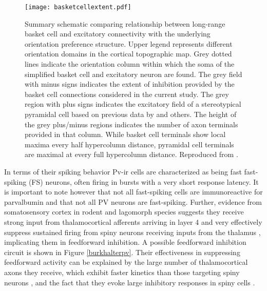 \begin{figure}
	\centering
        \texttt{[image: basketcellextent.pdf]}
	\caption[Schematic representing the proposed spatial distribution
      of pyramidal and basket cell extents and their relationship to
      the orientation map in V1. Reproduced from
      \cite{Buzas2001}.]{Summary schematic comparing relationship
      between long-range basket cell and excitatory connectivity with
      the underlying orientation preference structure. Upper legend
      represents different orientation domains in the cortical
      topographic map. Grey dotted lines indicate the orientation
      column within which the soma of the simplified basket cell and
      excitatory neuron are found. The grey field with minus signs
      indicates the extent of inhibition provided by the basket cell
      connections considered in the current study. The grey region
      with plus signs indicates the excitatory field of a
      stereotypical pyramidal cell based on previous data by
      \cite{Bosking1997,Kisvarday1997a} and others. The height of the
      grey plus/minus regions indicates the number of axon terminals
      provided in that column. While basket cell terminals show local
      maxima every half hypercolumn distance, pyramidal cell terminals
      are maximal at every full hypercolumn distance. Reproduced from
      \cite{Buzas2001}.}
	\label{BasketCellExtent}
\end{figure}

In terms of their spiking behavior Pv-ir cells are characterized as
being fast fast-spiking (FS) neurons, often firing in bursts with a
very short response latency. It is important to note however that not
all fast-spiking cells are immunoreactive for parvalbumin and that not
all PV neurons are fast-spiking. Further, evidence from somatosensory
cortex in rodent and lagomorph species suggests they receive strong
input from thalamocortical afferents arriving in layer 4 and very
effectively suppress sustained firing from spiny neurons receiving
inputs from the thalamus \citep{Swadlow2003}, implicating them in
feedforward inhibition. A possible feedforward inhibition circuit is
shown in Figure \ref{burkhalterpv}. Their effectiveness in suppressing
feedforward activity can be explained by the large number of
thalamocortical axons they receive, which exhibit faster kinetics than
those targeting spiny neurons \citep{Cruikshank2007,Gabernet2005}, and
the fact that they evoke large inhibitory responses in spiny cells
\citep{Cruikshank2007,Gabernet2005}.

